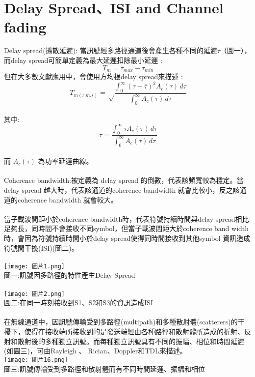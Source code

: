 \documentclass[12pt,a4paper]{article} %
\begin{document}
\section{Delay Spread、ISI and Channel fading}
Delay spread(擴散延遲)\cite{goldsmith2005wireless}: 當訊號經多路徑通道後會產生各種不同的延遲$\tau$（圖一），而delay spread可簡單定義為最大延遲扣除最小延遲 :
\[\ T_{m}= \tau_{max} - \tau_{min}\]
但在大多數文獻應用中，會使用方均根delay spread來描述 : 
\[\ T_{m(r.m.s)}= \sqrt\frac{\int_{0}^{\infty} (\tau-\bar{\tau})^2A_{c}(\tau) \, d\tau}{\int_{0}^{\infty}A_{c}(\tau) \, d\tau}\]\\
其中:
\[\ \bar{\tau}= \frac{\int_{0}^{\infty} {\tau}A_{c}(\tau) \, d\tau}{\int_{0}^{\infty}A_{c}(\tau) \, d\tau}\]\\
而 \(A_{c}(\tau)\) 為功率延遲曲線。\\
\\Coherence bandwidth\cite{goldsmith2005wireless}:被定義為 delay spread 的倒數，代表該頻寬較為穩定。當delay spread 越大時，代表該通道的coherence bandwidth 就會比較小，反之該通道的coherence bandwidth 就會較大。 \\
\\
當子載波間距小於coherence bandwidth時，代表符號持續時間與delay spread相比足夠長，同時間不會接收不同symbol，但當子載波間距大於coherence band
width 時，會因為符號持續時間小於delay spread使得同時間接收到其他symbol
資訊造成符號間干擾(ISI)(圖二)。\\
\\

\texttt{[image: 圖片1.png]}\\
圖一:訊號因多路徑的特性產生Delay Spread\cite{WhatisISinLTE?} \\\\

\texttt{[image: 圖片2.png]}\\
圖二:在同一時刻接收到S1、S2和S3的資訊造成ISI\cite{WhatisISinLTE?}\\\\
在無線通道中，因訊號傳輸受到多路徑(multipath)和多種散射體(scatterers)的干擾下，使得在接收端所接收到的是發送端經由各種路徑和散射體所造成的折射、反射和散射後的多種獨立訊號\cite{goldsmith2005wireless}。而每種獨立訊號具有不同的振幅、相位和時間延遲(如圖三)，可由Rayleigh 、 Rician、Doppler和TDL來描述。\\
\texttt{[image: 圖片16.png]}\\
圖三:訊號傳輸受到多路徑和散射體而有不同時間延遲、振幅和相位\cite{goldsmith2005wireless}
\newpage
\end{document}
